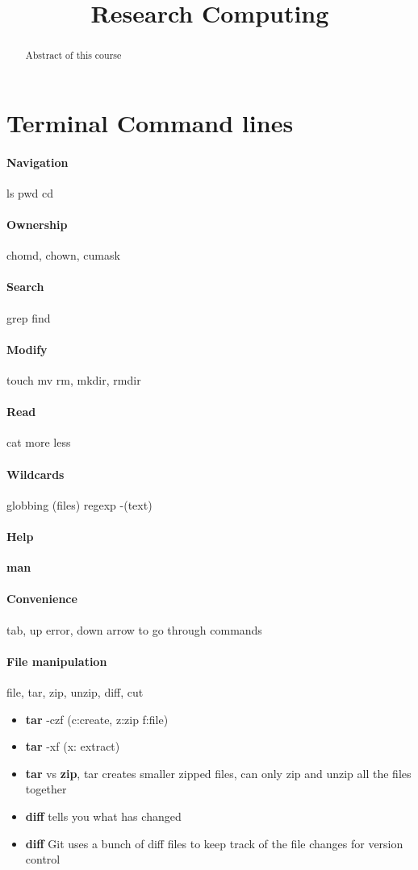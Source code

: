 \documentclass[12pt,a4paper]{article}
\newcommand{\topic}{Research Computing}
\begin{document}
\title{\topic}
\begin{titlepage}
    \maketitle
\end{titlepage}

\tableofcontents

\newpage
\begin{abstract}
\noindent
Abstract of this course
\end{abstract}

\section{Terminal Command lines}
\paragraph{Navigation} ls pwd cd 
\paragraph{Ownership} chomd, chown, cumask
\paragraph{Search} grep find
\paragraph{Modify} touch mv rm, mkdir, rmdir 
\paragraph{Read} cat more less
\paragraph{Wildcards}  globbing (files) regexp -(text)
\paragraph{Help} \textbf{man}
\paragraph{Convenience} tab, up error, down arrow to go through commands
\paragraph{File manipulation} file, tar, zip, unzip, diff, cut
    \begin{itemize}
        \item \textbf{tar} -czf (c:create, z:zip f:file)
        \item \textbf{tar} -xf (x: extract)
        \item \textbf{tar} vs \textbf{zip}, tar creates smaller zipped files, can only zip and unzip all the files together
        \item \textbf{diff} tells you what has changed
        \item \textbf{diff} Git uses a bunch of diff files to keep track of the file changes for version control 
    \end{itemize}
\end{document}
